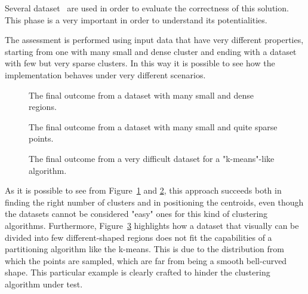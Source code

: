 \label{experiments}
Several dataset~\cite{ClusteringDatasets} are used in order to evaluate the correctness 
of this solution. This phase is a very important in order to understand its potentialities.

The assessment is performed using input data that have very different properties,
starting from one with many small and dense cluster and ending with a dataset with few 
but very sparse clusters. In this way it is possible to see how the implementation
behaves under very different scenarios.

\begin{figure}[t]
  \caption{The final outcome from a dataset with many small and dense regions.}
  \label{dataset1}
\end{figure}

\begin{figure}[t]
  \caption{The final outcome from a dataset with many small and quite sparse points.}
  \label{dataset2}
\end{figure}

\begin{figure}[t]
  \caption{The final outcome from a very difficult dataset for a "k-means"-like algorithm.}
  \label{dataset3}
\end{figure}

As it is possible to see from Figure~\ref{dataset1} and \ref{dataset2}, this approach
succeeds both in finding the right number of clusters and in positioning the centroids, even
though the datasets cannot be considered "easy" ones for this kind of clustering
algorithms. 
Furthermore, Figure~\ref{dataset3} highlights how a dataset that visually can be 
divided into few different-shaped regions does not fit the capabilities of a partitioning
algorithm like the k-means. This is due to the distribution from which the points are
sampled, which are far from being a smooth bell-curved shape.
This particular example is clearly crafted to hinder the clustering algorithm under test.
